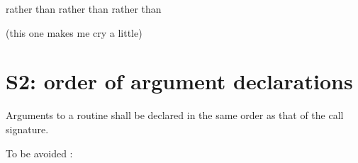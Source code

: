 \documentclass[letterpaper,10pt,english]{sphinxmanual}
\begin{document}
 rather than 
 rather than 
 rather than 

(this one makes me cry a little)


\section{S2: order of argument declarations}
\label{\detokenize{rules/S2:s2-order-of-argument-declarations}}\label{\detokenize{rules/S2::doc}}
Arguments to a routine shall be declared in the same order as that of the call signature.

To be avoided :
\def\sphinxLiteralBlockLabel{\label{\detokenize{rules/S2:id1}}}
\begin{sphinxVerbatim}[commandchars=\\\{\}]
   

    
    
   
\end{sphinxVerbatim}
\end{document}
